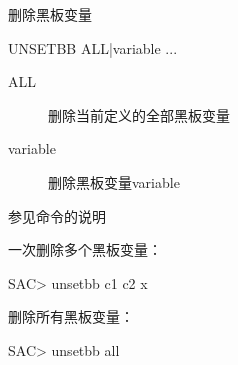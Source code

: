 \label{cmd:unsetbb}

删除黑板变量

\begin{SACSTX}
UNSETBB ALL|variable ...
\end{SACSTX}

\begin{description}
\item [ALL] 删除当前定义的全部黑板变量
\item [variable] 删除黑板变量variable
\end{description}

参见命令的说明

一次删除多个黑板变量：
\begin{SACCode}
SAC> unsetbb c1 c2 x
\end{SACCode}

删除所有黑板变量：
\begin{SACCode}
SAC> unsetbb all
\end{SACCode}
